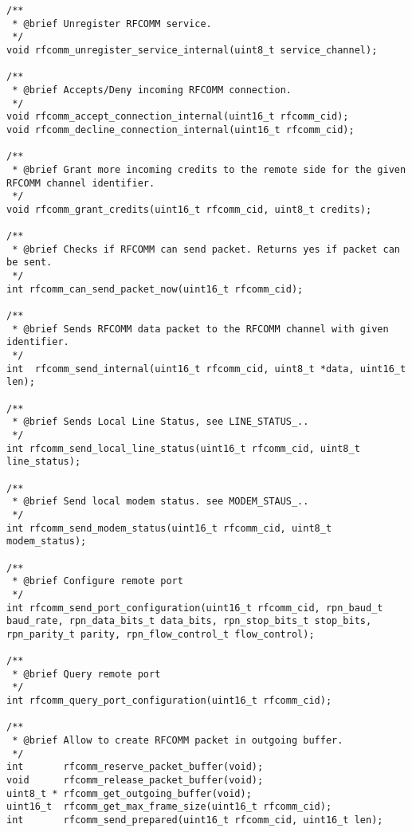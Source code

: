 \begin{lstlisting}
/** 
 * @brief Unregister RFCOMM service.
 */
void rfcomm_unregister_service_internal(uint8_t service_channel);

/** 
 * @brief Accepts/Deny incoming RFCOMM connection.
 */
void rfcomm_accept_connection_internal(uint16_t rfcomm_cid);
void rfcomm_decline_connection_internal(uint16_t rfcomm_cid);

/** 
 * @brief Grant more incoming credits to the remote side for the given RFCOMM channel identifier.
 */
void rfcomm_grant_credits(uint16_t rfcomm_cid, uint8_t credits);

/** 
 * @brief Checks if RFCOMM can send packet. Returns yes if packet can be sent.
 */
int rfcomm_can_send_packet_now(uint16_t rfcomm_cid);

/** 
 * @brief Sends RFCOMM data packet to the RFCOMM channel with given identifier.
 */
int  rfcomm_send_internal(uint16_t rfcomm_cid, uint8_t *data, uint16_t len);

/** 
 * @brief Sends Local Line Status, see LINE_STATUS_..
 */
int rfcomm_send_local_line_status(uint16_t rfcomm_cid, uint8_t line_status);

/** 
 * @brief Send local modem status. see MODEM_STAUS_..
 */
int rfcomm_send_modem_status(uint16_t rfcomm_cid, uint8_t modem_status);

/** 
 * @brief Configure remote port 
 */
int rfcomm_send_port_configuration(uint16_t rfcomm_cid, rpn_baud_t baud_rate, rpn_data_bits_t data_bits, rpn_stop_bits_t stop_bits, rpn_parity_t parity, rpn_flow_control_t flow_control);

/** 
 * @brief Query remote port 
 */
int rfcomm_query_port_configuration(uint16_t rfcomm_cid);

/** 
 * @brief Allow to create RFCOMM packet in outgoing buffer.
 */
int       rfcomm_reserve_packet_buffer(void);
void      rfcomm_release_packet_buffer(void);
uint8_t * rfcomm_get_outgoing_buffer(void);
uint16_t  rfcomm_get_max_frame_size(uint16_t rfcomm_cid);
int       rfcomm_send_prepared(uint16_t rfcomm_cid, uint16_t len);
\end{lstlisting}
\pagebreak
